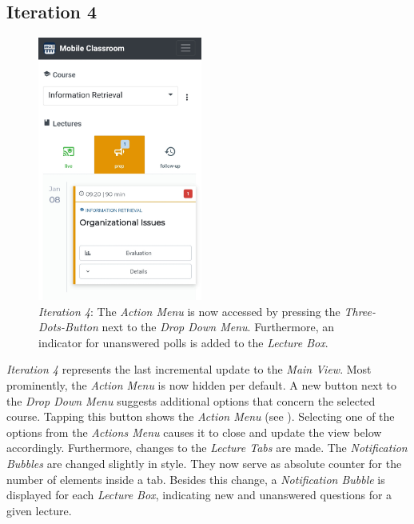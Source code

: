 \subsection{Iteration 4}
\begin{figure}
	\vspace*{-1cm}
	\begin{center}
		\includegraphics[width=0.48\textwidth]{screenshots/redesign/main_view_iteration_4.jpg}
	\end{center}
	\caption{\emph{Iteration 4}: The \emph{Action Menu} is now accessed by pressing the \emph{Three-Dots-Button} next to the \emph{Drop Down Menu}. Furthermore, an indicator for unanswered polls is added to the \emph{Lecture Box}.}
	\label{fig:main_view_iteration_4}
\end{figure}
\emph{Iteration 4} represents the last incremental update to the \emph{Main View}.
Most prominently, the  \emph{Action Menu} is now hidden per default. 
A new button next to the \emph{Drop Down Menu} suggests additional options that concern the selected course. Tapping this button shows the \emph{Action Menu} (see ). Selecting one of the options from the \emph{Actions Menu} causes it to close and update the view below accordingly.
Furthermore, changes to the \emph{Lecture Tabs} are made. The \emph{Notification Bubbles} are changed slightly in style. They now serve as absolute counter for the number of elements inside a tab.
Besides this change, a \emph{Notification Bubble} is displayed for each \emph{Lecture Box}, indicating new and unanswered questions for a given lecture.
\\
\\ 
